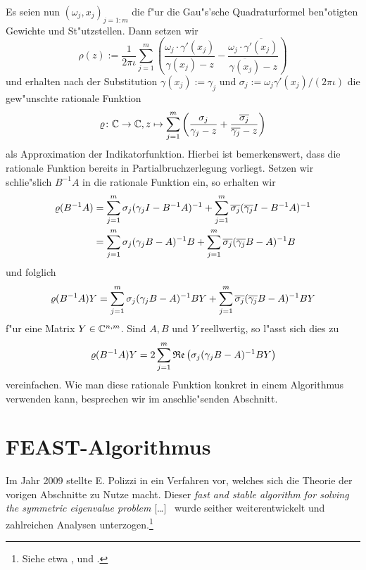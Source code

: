 Es seien nun $(\omega_j, x_j)_{j=1:m}$
die f"ur die Gau"s'sche Quadraturformel ben"otigten Gewichte und St"utzstellen.
Dann setzen wir
\[
\rho(z) := \frac{1}{2\pi\iota}\sum_{j=1}^m \left(
\frac{\omega_j \cdot \gamma'(x_j)}{\gamma(x_j)-z} - \frac{\omega_j \cdot \overline{\gamma'(x_j)}}{\overline{\gamma(x_j)}-z}
\right)
\]
und erhalten nach der Substitution $\gamma(x_j) := \gamma_j$ und
$\sigma_j := \omega_j \gamma'(x_j) / (2\pi\iota)$ die gew"unschte rationale
Funktion
\[
\varrho\colon\mathbb{C}\to\mathbb{C}, z\mapsto\sum_{j=1}^m\left(\frac{\sigma_j}{\gamma_j - z} +
\frac{\overline{\sigma_j}}{\overline{\gamma_j} - z}\right)
\]
als Approximation der Indikatorfunktion. Hierbei ist bemerkenswert, dass die
rationale Funktion bereits in Partialbruchzerlegung vorliegt.
Setzen wir schlie"slich $B^{-1}A$ in die
rationale Funktion ein, so erhalten wir
\begin{align*}
\varrho(B^{-1}A) &= \sum_{j=1}^m \sigma_j (\gamma_j I - B^{-1}A)^{-1} +
\sum_{j=1}^m \overline{\sigma_j} (\overline{\gamma_j} I - B^{-1}A)^{-1}\\
&= \sum_{j=1}^m \sigma_j (\gamma_j B - A)^{-1} B +
\sum_{j=1}^m \overline{\sigma_j} (\overline{\gamma_j} B - A)^{-1} B
\end{align*}
und folglich
\[
\varrho(B^{-1}A)Y =
\sum_{j=1}^m \sigma_j (\gamma_j B - A)^{-1} BY +
\sum_{j=1}^m \overline{\sigma_j} (\overline{\gamma_j} B - A)^{-1} BY
\]
f"ur eine Matrix $Y\in\mathbb{C}^{n,m}$. Sind $A, B$ und $Y$ reellwertig, so l"asst sich dies zu
\begin{equation}\label{eq:chap4:realteilsumme}
\varrho(B^{-1}A)Y =
2\sum_{j=1}^m \mathfrak{Re}\left(\sigma_j (\gamma_j B - A)^{-1} BY\right)
\end{equation}
vereinfachen. Wie man diese rationale Funktion konkret in einem Algorithmus verwenden kann, besprechen wir im anschlie"senden Abschnitt.

\newpage

\section{FEAST-Algorithmus}

Im Jahr 2009 stellte E. Polizzi in \cite{polizzi} ein Verfahren vor, welches sich die Theorie der vorigen Abschnitte zu Nutze macht. Dieser \glqq[\ldots] \emph{fast and stable algorithm for solving the symmetric eigenvalue problem} [\ldots]\grqq\ \cite[Abstract]{polizzi} wurde seither weiterentwickelt und zahlreichen Analysen unterzogen.\footnote{Siehe etwa \cite{lzp},\cite{kpt} und \cite{ptep}.}\\

